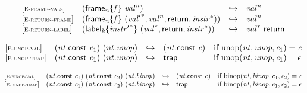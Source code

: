 \vspace{1ex}

$$
\begin{array}{@{}l@{}lcl@{}l@{}}
{[\textsc{\scriptsize E{-}frame{-}vals}]} \quad & ({{\mathsf{frame}}_{{\mathit{n}}}}{\{{\mathit{f}}\}}~{{\mathit{val}}^{{\mathit{n}}}}) &\hookrightarrow& {{\mathit{val}}^{{\mathit{n}}}} &  \\
{[\textsc{\scriptsize E{-}return{-}frame}]} \quad & ({{\mathsf{frame}}_{{\mathit{n}}}}{\{{\mathit{f}}\}}~({{\mathit{val}'}^\ast}, {{\mathit{val}}^{{\mathit{n}}}}, \mathsf{return}, {{\mathit{instr}}^\ast})) &\hookrightarrow& {{\mathit{val}}^{{\mathit{n}}}} &  \\
{[\textsc{\scriptsize E{-}return{-}label}]} \quad & ({{\mathsf{label}}_{{\mathit{k}}}}{\{{{\mathit{instr}'}^\ast}\}}~({{\mathit{val}}^\ast}, \mathsf{return}, {{\mathit{instr}}^\ast})) &\hookrightarrow& {{\mathit{val}}^\ast}~\mathsf{return} &  \\
\end{array}
$$

\vspace{1ex}

$$
\begin{array}{@{}l@{}lcl@{}l@{}}
{[\textsc{\scriptsize E{-}unop{-}val}]} \quad & ({\mathit{nt}}.\mathsf{const}~{\mathit{c}}_{{1}})~({\mathit{nt}} . {\mathit{unop}}) &\hookrightarrow& ({\mathit{nt}}.\mathsf{const}~{\mathit{c}}) &\quad
  \mbox{if}~{\mathrm{unop}}({\mathit{nt}}, {\mathit{unop}}, {\mathit{c}}_{{1}}) = {\mathit{c}} \\
{[\textsc{\scriptsize E{-}unop{-}trap}]} \quad & ({\mathit{nt}}.\mathsf{const}~{\mathit{c}}_{{1}})~({\mathit{nt}} . {\mathit{unop}}) &\hookrightarrow& \mathsf{trap} &\quad
  \mbox{if}~{\mathrm{unop}}({\mathit{nt}}, {\mathit{unop}}, {\mathit{c}}_{{1}}) = \epsilon \\
\end{array}
$$

\vspace{1ex}

$$
\begin{array}{@{}l@{}lcl@{}l@{}}
{[\textsc{\scriptsize E{-}binop{-}val}]} \quad & ({\mathit{nt}}.\mathsf{const}~{\mathit{c}}_{{1}})~({\mathit{nt}}.\mathsf{const}~{\mathit{c}}_{{2}})~({\mathit{nt}} . {\mathit{binop}}) &\hookrightarrow& ({\mathit{nt}}.\mathsf{const}~{\mathit{c}}) &\quad
  \mbox{if}~{\mathrm{binop}}({\mathit{nt}}, {\mathit{binop}}, {\mathit{c}}_{{1}}, {\mathit{c}}_{{2}}) = {\mathit{c}} \\
{[\textsc{\scriptsize E{-}binop{-}trap}]} \quad & ({\mathit{nt}}.\mathsf{const}~{\mathit{c}}_{{1}})~({\mathit{nt}}.\mathsf{const}~{\mathit{c}}_{{2}})~({\mathit{nt}} . {\mathit{binop}}) &\hookrightarrow& \mathsf{trap} &\quad
  \mbox{if}~{\mathrm{binop}}({\mathit{nt}}, {\mathit{binop}}, {\mathit{c}}_{{1}}, {\mathit{c}}_{{2}}) = \epsilon \\
\end{array}
$$

